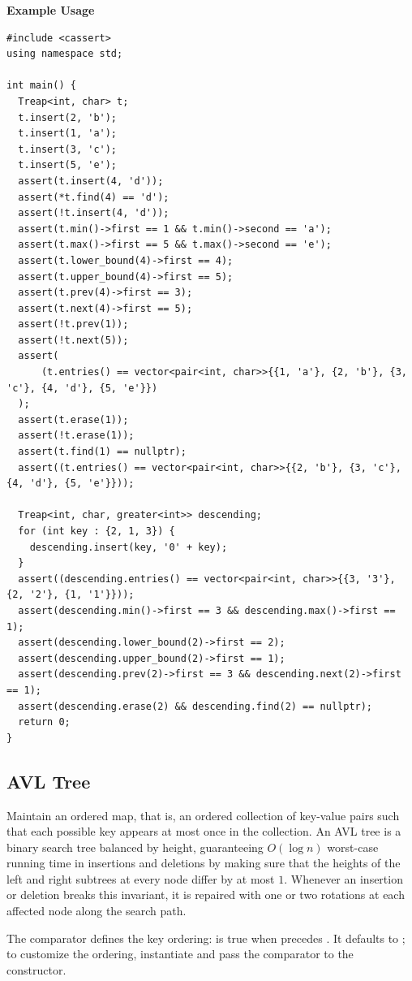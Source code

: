 \textbf{Example Usage}\par
\begin{lstlisting}[style=cpp]
#include <cassert>
using namespace std;

int main() {
  Treap<int, char> t;
  t.insert(2, 'b');
  t.insert(1, 'a');
  t.insert(3, 'c');
  t.insert(5, 'e');
  assert(t.insert(4, 'd'));
  assert(*t.find(4) == 'd');
  assert(!t.insert(4, 'd'));
  assert(t.min()->first == 1 && t.min()->second == 'a');
  assert(t.max()->first == 5 && t.max()->second == 'e');
  assert(t.lower_bound(4)->first == 4);
  assert(t.upper_bound(4)->first == 5);
  assert(t.prev(4)->first == 3);
  assert(t.next(4)->first == 5);
  assert(!t.prev(1));
  assert(!t.next(5));
  assert(
      (t.entries() == vector<pair<int, char>>{{1, 'a'}, {2, 'b'}, {3, 'c'}, {4, 'd'}, {5, 'e'}})
  );
  assert(t.erase(1));
  assert(!t.erase(1));
  assert(t.find(1) == nullptr);
  assert((t.entries() == vector<pair<int, char>>{{2, 'b'}, {3, 'c'}, {4, 'd'}, {5, 'e'}}));

  Treap<int, char, greater<int>> descending;
  for (int key : {2, 1, 3}) {
    descending.insert(key, '0' + key);
  }
  assert((descending.entries() == vector<pair<int, char>>{{3, '3'}, {2, '2'}, {1, '1'}}));
  assert(descending.min()->first == 3 && descending.max()->first == 1);
  assert(descending.lower_bound(2)->first == 2);
  assert(descending.upper_bound(2)->first == 1);
  assert(descending.prev(2)->first == 3 && descending.next(2)->first == 1);
  assert(descending.erase(2) && descending.find(2) == nullptr);
  return 0;
}
\end{lstlisting}
\subsection{AVL Tree}
\label{sec:2.4.2}
Maintain an ordered map, that is, an ordered collection of key-value pairs such that each possible key appears at most once in the collection. An AVL tree is a binary search tree balanced by height, guaranteeing $O(\log n)$ worst-case running time in insertions and deletions by making sure that the heights of the left and right subtrees at every node differ by at most $1$. Whenever an insertion or deletion breaks this invariant, it is repaired with one or two rotations at each affected node along the search path.

The comparator  defines the key ordering:  is true when  precedes . It defaults to ; to customize the ordering, instantiate  and pass the comparator to the constructor.

